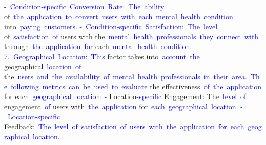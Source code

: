 \begin{tcolorbox}[colframe=gray!70!black,colback=white, title=Sample 6]
{}\textcolor{blue}{-}\textcolor{blue}{~Condition}\textcolor{blue}{-specific}\textcolor{blue}{~Conversion}\textcolor{blue}{~Rate}\textcolor{blue}{:}\textcolor{blue}{~The}\textcolor{blue}{~ability} of\textcolor{blue}{~the}\textcolor{blue}{~application}\textcolor{blue}{~to}\textcolor{blue}{~convert}\textcolor{blue}{~users}\textcolor{blue}{~with}\textcolor{blue}{~each}\textcolor{blue}{~mental}\textcolor{blue}{~health}\textcolor{blue}{~condition} into\textcolor{blue}{~paying}\textcolor{blue}{~customers}\textcolor{blue}{.
}\textcolor{blue}{-}\textcolor{blue}{~Condition}\textcolor{blue}{-specific}\textcolor{blue}{~Satisfaction}\textcolor{blue}{:}\textcolor{blue}{~The}\textcolor{blue}{~level} of\textcolor{blue}{~satisfaction}\textcolor{blue}{~of} users with the\textcolor{blue}{~mental}\textcolor{blue}{~health}\textcolor{blue}{~professionals}\textcolor{blue}{~they}\textcolor{blue}{~connect}\textcolor{blue}{~with} through\textcolor{blue}{~the}\textcolor{blue}{~application}\textcolor{blue}{~for} each\textcolor{blue}{~mental}\textcolor{blue}{~health}\textcolor{blue}{~condition}\textcolor{blue}{.
}\textcolor{blue}{7}.\textcolor{blue}{~Ge}\textcolor{blue}{ographical}\textcolor{blue}{~Location}\textcolor{blue}{:}\textcolor{blue}{~This} factor takes into\textcolor{blue}{~account}\textcolor{blue}{~the} geographical\textcolor{blue}{~location}\textcolor{blue}{~of} the\textcolor{blue}{~users}\textcolor{blue}{~and}\textcolor{blue}{~the}\textcolor{blue}{~availability}\textcolor{blue}{~of}\textcolor{blue}{~mental}\textcolor{blue}{~health}\textcolor{blue}{~professionals}\textcolor{blue}{~in}\textcolor{blue}{~their}\textcolor{blue}{~area}\textcolor{blue}{.}\textcolor{blue}{~The}\textcolor{blue}{~following}\textcolor{blue}{~metrics}\textcolor{blue}{~can}\textcolor{blue}{~be}\textcolor{blue}{~used}\textcolor{blue}{~to}\textcolor{blue}{~evaluate} the effectiveness\textcolor{blue}{~of}\textcolor{blue}{~the}\textcolor{blue}{~application} for each\textcolor{blue}{~geographical}\textcolor{blue}{~location}\textcolor{blue}{:
}\textcolor{blue}{-} Location\textcolor{blue}{-specific} Engagement\textcolor{blue}{:} The\textcolor{blue}{~level}\textcolor{blue}{~of} engagement\textcolor{blue}{~of} users with\textcolor{blue}{~the}\textcolor{blue}{~application} for\textcolor{blue}{~each}\textcolor{blue}{~geographical}\textcolor{blue}{~location}\textcolor{blue}{.
}\textcolor{blue}{-}\textcolor{blue}{~Location}\textcolor{blue}{-specific} Feedback\textcolor{blue}{:}\textcolor{blue}{~The}\textcolor{blue}{~level}\textcolor{blue}{~of}\textcolor{blue}{~satisfaction}\textcolor{blue}{~of}\textcolor{blue}{~users}\textcolor{blue}{~with}\textcolor{blue}{~the}\textcolor{blue}{~application}\textcolor{blue}{~for}\textcolor{blue}{~each}\textcolor{blue}{~geographical}\textcolor{blue}{~location}\textcolor{blue}{.
}
\end{tcolorbox}
